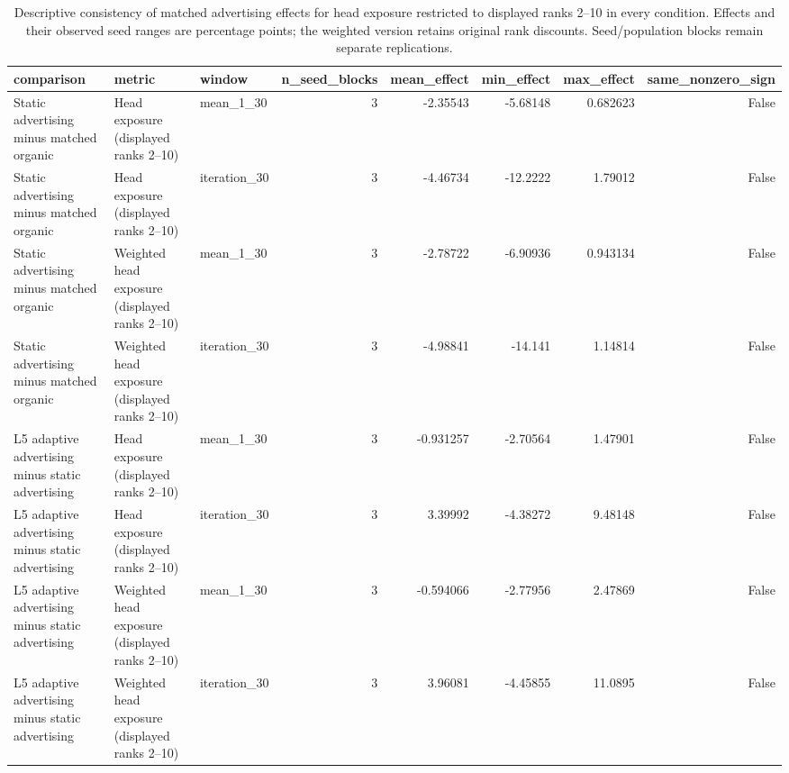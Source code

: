 \begin{table}[htbp!]
\centering
\small
\setlength{\tabcolsep}{3pt}
\renewcommand{\arraystretch}{1.1}
\begin{tabular}{lllrrrrr}
\hline
comparison & metric & window & n\_seed\_blocks & mean\_effect & min\_effect & max\_effect & same\_nonzero\_sign \\
\hline
Static advertising minus matched organic & Head exposure (displayed ranks 2–10) & mean\_1\_30 & 3 & -2.35543 & -5.68148 & 0.682623 & False \\
Static advertising minus matched organic & Head exposure (displayed ranks 2–10) & iteration\_30 & 3 & -4.46734 & -12.2222 & 1.79012 & False \\
Static advertising minus matched organic & Weighted head exposure (displayed ranks 2–10) & mean\_1\_30 & 3 & -2.78722 & -6.90936 & 0.943134 & False \\
Static advertising minus matched organic & Weighted head exposure (displayed ranks 2–10) & iteration\_30 & 3 & -4.98841 & -14.141 & 1.14814 & False \\
L5 adaptive advertising minus static advertising & Head exposure (displayed ranks 2–10) & mean\_1\_30 & 3 & -0.931257 & -2.70564 & 1.47901 & False \\
L5 adaptive advertising minus static advertising & Head exposure (displayed ranks 2–10) & iteration\_30 & 3 & 3.39992 & -4.38272 & 9.48148 & False \\
L5 adaptive advertising minus static advertising & Weighted head exposure (displayed ranks 2–10) & mean\_1\_30 & 3 & -0.594066 & -2.77956 & 2.47869 & False \\
L5 adaptive advertising minus static advertising & Weighted head exposure (displayed ranks 2–10) & iteration\_30 & 3 & 3.96081 & -4.45855 & 11.0895 & False \\
\hline
\end{tabular}
\caption{Descriptive consistency of matched advertising effects for head exposure restricted to displayed ranks 2--10 in every condition. Effects and their observed seed ranges are percentage points; the weighted version retains original rank discounts. Seed/population blocks remain separate replications.}
\label{chap:results:tab:rq1_advertising_ranks_2_10_seed_consistency}
\end{table}
